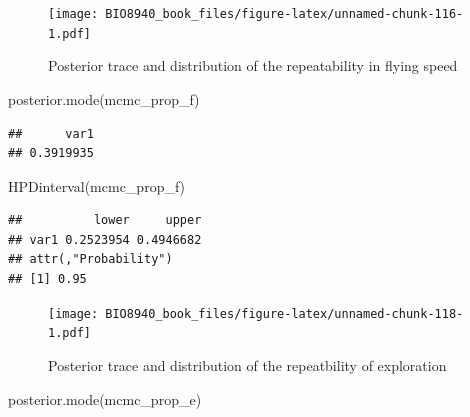 \documentclass[
  12pt,
]{book}
\newenvironment{Shaded}{\begin{snugshade}}{\end{snugshade}}
\newcommand{\DecValTok}[1]{\textcolor[rgb]{0.00,0.00,0.81}{#1}}
\newcommand{\FunctionTok}[1]{\textcolor[rgb]{0.00,0.00,0.00}{#1}}
\newcommand{\NormalTok}[1]{#1}
\newcommand{\OtherTok}[1]{\textcolor[rgb]{0.56,0.35,0.01}{#1}}
\newcommand{\SpecialCharTok}[1]{\textcolor[rgb]{0.00,0.00,0.00}{#1}}
\begin{document}
\begin{figure}
\centering
\texttt{[image: BIO8940\_book\_files/figure-latex/unnamed-chunk-116-1.pdf]}
\caption{\label{fig:unnamed-chunk-116}Posterior trace and distribution of the repeatability in flying speed}
\end{figure}

\begin{Shaded}
\begin{Highlighting}[]
\FunctionTok{posterior.mode}\NormalTok{(mcmc\_prop\_f)}
\end{Highlighting}
\end{Shaded}

\begin{verbatim}
##      var1 
## 0.3919935
\end{verbatim}

\begin{Shaded}
\begin{Highlighting}[]
\FunctionTok{HPDinterval}\NormalTok{(mcmc\_prop\_f)}
\end{Highlighting}
\end{Shaded}

\begin{verbatim}
##          lower     upper
## var1 0.2523954 0.4946682
## attr(,"Probability")
## [1] 0.95
\end{verbatim}

\begin{Shaded}
\end{Shaded}

\begin{figure}
\centering
\texttt{[image: BIO8940\_book\_files/figure-latex/unnamed-chunk-118-1.pdf]}
\caption{\label{fig:unnamed-chunk-118}Posterior trace and distribution of the repeatbility of exploration}
\end{figure}

\begin{Shaded}
\begin{Highlighting}[]
\FunctionTok{posterior.mode}\NormalTok{(mcmc\_prop\_e)}
\end{Highlighting}
\end{Shaded}
\end{document}
